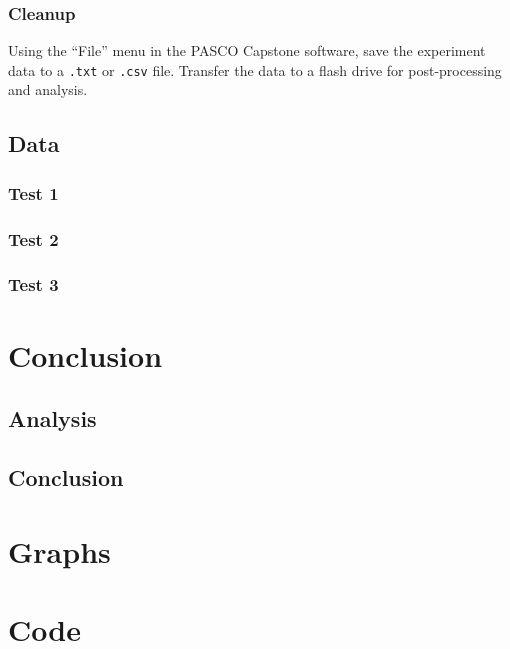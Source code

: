 \documentclass[12 pt]{report}
\begin{document}
\subsection{Cleanup} \label{procedures-cleanup}
Using the ``File'' menu in the PASCO Capstone software, save the experiment data to a \texttt{.txt} or \texttt{.csv} file. Transfer the data to a flash drive for post-processing and analysis.

\section{Data} \label{data}
\subsection{Test 1} \label{data-test_1}


\subsection{Test 2} \label{data-test_2}


\subsection{Test 3} \label{data-test_3}


\chapter{Conclusion} \label{conclusion-chapter}
\section{Analysis} \label{analysis}


\section{Conclusion} \label{conclusion-section}


\printbibliography[heading=subbibintoc]

\appendix
\chapter{Graphs} \label{graphs}


\chapter{Code} \label{code}
\end{document}
